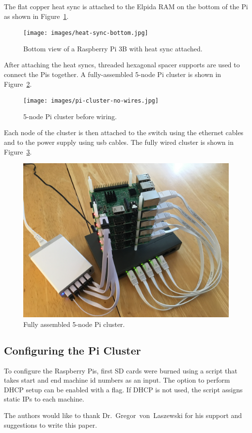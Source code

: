 The flat copper heat sync is attached to the Elpida RAM on the bottom
of the Pi as shown in Figure~\ref{f:heat-sync-bottom}.

\begin{figure}[!ht]
  \centering\texttt{[image: images/heat-sync-bottom.jpg]} \caption{Bottom
  view of a Raspberry Pi 3B with heat sync
  attached.}\label{f:heat-sync-bottom}
\end{figure}

After attaching the heat syncs, threaded hexagonal spacer supports are
used to connect the Pis together. A fully-assembled 5-node Pi cluster
is shown in Figure~\ref{f:cluster-no-wires}.

\begin{figure}[!ht]
  \centering\texttt{[image: images/pi-cluster-no-wires.jpg]}
  \caption{5-node Pi cluster before wiring.}\label{f:cluster-no-wires}
\end{figure}

Each node of the cluster is then attached to the switch using the
ethernet cables and to the power supply using usb cables. The fully wired cluster is shown in Figure~\ref{f:complete-cluster}.

\begin{figure}[!ht]
  \centering\includegraphics[width=\columnwidth]{images/complete-pi-cluster.jpg}
  \caption{Fully assembled 5-node Pi cluster.}\label{f:complete-cluster}
\end{figure}


\subsection{Configuring the Pi Cluster}
To configure the Raspberry Pis, first SD cards were burned using a
script that takes start and end machine id numbers as an input. The
option to perform DHCP setup can be enabled with a flag. If DHCP is
not used, the script assigns static IPs to each machine.

\begin{acks}

  The authors would like to thank Dr.~Gregor~von~Laszewski for his
  support and suggestions to write this paper.

\end{acks}



